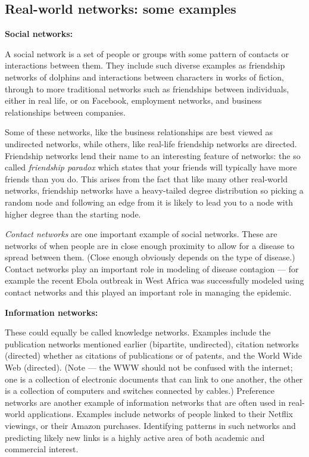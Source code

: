 \subsection{Real-world networks: some examples}

{\bf Social networks:} 

A social network is a set of people or groups with some pattern of contacts or interactions between them. They include such diverse examples as friendship networks of dolphins and interactions between characters in works of fiction, through to more traditional networks such as friendships between individuals, either in real life, or on Facebook, employment networks, and business relationships between companies.

Some of these networks, like the business relationships are best viewed as undirected networks, while others, like real-life friendship networks are directed. Friendship networks lend their name to an interesting feature of networks: the so called \emph{friendship paradox} which states that your friends will typically have more friends than you do. This arises from the fact that like many other real-world networks, friendship networks have a heavy-tailed degree distribution so picking a random node and following an edge from it is likely to lead you to a node with higher degree than the starting node.

\emph{Contact networks} are one important example of social networks. These are networks of when people are in close enough proximity to allow for a disease to spread between them. (Close enough obviously depends on the type of disease.) Contact networks play an important role in modeling of disease contagion --- for example the recent Ebola outbreak in West Africa was successfully modeled using contact networks and this played an important role in managing the epidemic.



{\bf Information networks:}

These could equally be called knowledge networks. Examples include the publication networks mentioned earlier (bipartite, undirected), citation networks (directed) whether as citations of publications or of patents, and the World Wide Web (directed). (Note --- the WWW should not be confused with the internet; one is a collection of electronic documents that can link to one another, the other is a collection of computers and switches connected by cables.) Preference networks are another example of information networks that are often used in real-world applications. Examples include networks of people linked to their Netflix viewings, or their Amazon purchases. Identifying patterns in such networks and predicting likely new links is a highly active area of both academic and commercial interest.


